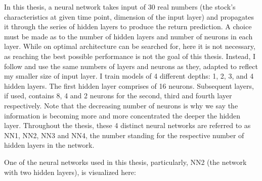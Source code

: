 		In this thesis, a neural network takes input of 30 real numbers (the stock's characteristics at given time point, dimension of the input layer) and propagates it through the series of hidden layers to produce the return prediction.	A choice must be made as to the number of hidden layers and number of neurons in each layer. While on optimal architecture can be searched for, here it is not necessary, as reaching the best possible performance is not the goal of this thesis. Instead, I follow \cite{gu2020empirical} and use the same numbers of layers and neurons as they, adapted to reflect my smaller size of input layer. I train models of 4 different depths: 1, 2, 3, and 4 hidden layers. The first hidden layer comprises of 16 neurons. Subsequent layers, if used, contains 8, 4 and 2 neurons for the second, third and fourth layer respectively. Note that the decreasing number of neurons is why we say the information is becoming more and more concentrated the deeper the hidden layer. Throughout the thesis, these 4 distinct neural networks are referred to as NN1, NN2, NN3 and NN4, the number standing for the respective number of hidden layers in the network.
		
		One of the neural networks used in this thesis, particularly, NN2 (the network with two hidden layers), is visualized here: 
		
	
		
